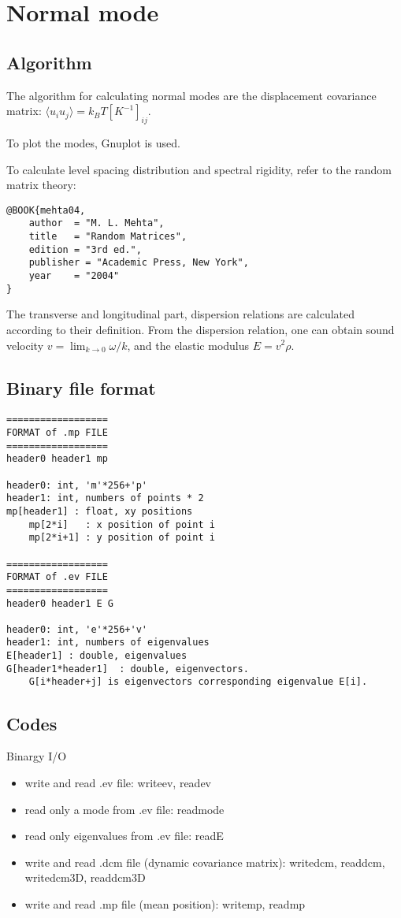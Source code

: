 \chapter{Normal mode}
\section{Algorithm}
The algorithm for calculating normal modes are the displacement covariance matrix: $\langle u_iu_j\rangle = k_BT [K^{-1}]_{ij}$.

To plot the modes, Gnuplot is used.

To calculate level spacing distribution and spectral rigidity, refer to the random matrix theory:
\begin{verbatim}
@BOOK{mehta04,
	author	= "M. L. Mehta", 
	title	= "Random Matrices", 
	edition	= "3rd ed.",
	publisher = "Academic Press, New York",
	year	= "2004"
}
\end{verbatim}

The transverse and longitudinal part, dispersion relations are calculated according to their definition. From the dispersion relation, one can obtain sound velocity $v=\lim_{k\to0}\omega/k$, and the elastic modulus $E=v^2\rho$.

\section{Binary file format}
\begin{verbatim}
==================
FORMAT of .mp FILE
==================
header0 header1 mp

header0: int, 'm'*256+'p'
header1: int, numbers of points * 2
mp[header1] : float, xy positions
	mp[2*i]   : x position of point i
	mp[2*i+1] : y position of point i
 
==================
FORMAT of .ev FILE
==================
header0 header1 E G

header0: int, 'e'*256+'v'
header1: int, numbers of eigenvalues
E[header1] : double, eigenvalues
G[header1*header1]  : double, eigenvectors.
	G[i*header+j] is eigenvectors corresponding eigenvalue E[i].
\end{verbatim}


\section{Codes}
Binargy I/O 
\begin{itemize}
\item  write and read .ev file: writeev, readev
\item read only a mode from .ev file: readmode
\item read only eigenvalues from .ev file: readE
\item write and read .dcm file (dynamic covariance matrix): writedcm, readdcm, writedcm3D, readdcm3D
\item write and read .mp file (mean position): writemp, readmp
\end{itemize}

